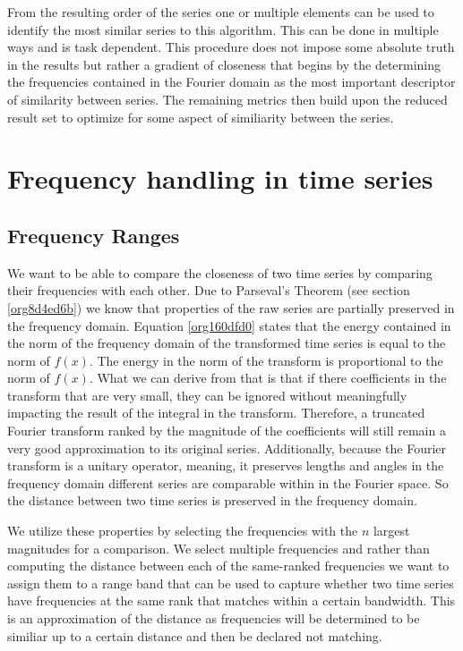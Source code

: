 \documentclass[phd,black, hidelinks]{PrincetonThesis}
\begin{document}
From the resulting order of the series one or multiple elements can be used to identify the most similar series to this algorithm. This can be done in multiple ways and is task dependent. This procedure does not impose some absolute truth in the results but rather a gradient of closeness that begins by the determining the frequencies contained in the Fourier domain as the most important descriptor of similarity between series. The remaining metrics then build upon the reduced result set to optimize for some aspect of similiarity between the series.

\section{Frequency handling in time series}
\label{sec:org5cbb63b}
\label{orgc3516ba}
\subsection{Frequency Ranges}
\label{sec:orged0367d}
\label{org9f9de98}
We want to be able to compare the closeness of two time series by comparing their frequencies with each other. Due to Parseval's Theorem (see section \ref{org8d4ed6b}) we know that properties of the raw series are partially preserved in the frequency domain. Equation \ref{org160dfd0} states that the energy contained in the norm of the frequency domain of the transformed time series is equal to the norm of \(f(x)\). The energy in the norm of the transform is proportional to the norm of \(f(x)\). What we can derive from that is that if there coefficients in the transform that are very small, they can be ignored without meaningfully impacting the result of the integral in the transform. Therefore, a truncated Fourier transform ranked by the magnitude of the coefficients will still remain a very good approximation to its original series. Additionally, because the Fourier transform is a unitary operator, meaning, it preserves lengths and angles in the frequency domain different series are comparable within in the Fourier space. So the distance between two time series is preserved in the frequency domain.

We utilize these properties by selecting the frequencies with the \(n\) largest magnitudes for a comparison. We select multiple frequencies and rather than computing the distance between each of the same-ranked frequencies we want to assign them to a range band that can be used to capture whether two time series have frequencies at the same rank that matches within a certain bandwidth. This is an approximation of the distance as frequencies will be determined to be similiar up to a certain distance and then be declared not matching.
\end{document}
